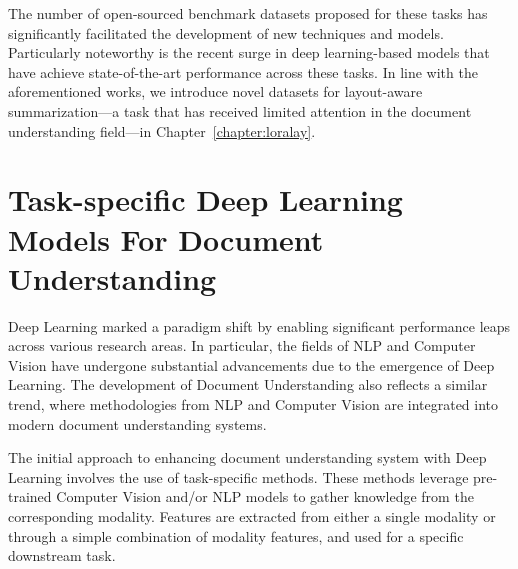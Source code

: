 The number of open-sourced benchmark datasets proposed for these tasks has significantly facilitated the development of new techniques and models. Particularly noteworthy is the recent surge in deep learning-based models that have achieve state-of-the-art performance across these tasks. In line with the aforementioned works, we introduce novel datasets for layout-aware summarization—a task that has received limited attention in the document understanding field—in Chapter~\ref{chapter:loralay}. 



\section{Task-specific Deep Learning Models For Document Understanding}

Deep Learning marked a paradigm shift by enabling significant performance leaps across various research areas. In particular, the fields of \ac{NLP} and Computer Vision have undergone substantial advancements due to the emergence of Deep Learning. The development of Document Understanding also reflects a similar trend, where methodologies from \ac{NLP} and Computer Vision are integrated into modern document understanding systems. 

The initial approach to enhancing document understanding system with Deep Learning involves the use of task-specific methods. These methods leverage pre-trained Computer Vision and/or \ac{NLP} models to gather knowledge from the corresponding modality. Features are extracted from either a single modality or through a simple combination of modality features, and used for a specific downstream task. 


